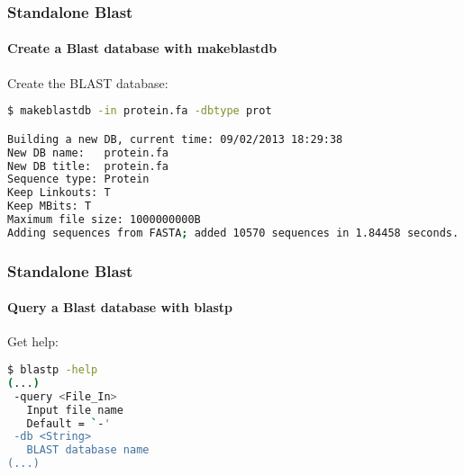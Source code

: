 \documentclass{beamer}
\begin{document}
\begin{frame}[fragile]
\frametitle{Standalone Blast}
\framesubtitle{Create a Blast database with makeblastdb}
Create the BLAST database:
\begin{lstlisting}[language=bash]
$ makeblastdb -in protein.fa -dbtype prot

Building a new DB, current time: 09/02/2013 18:29:38
New DB name:   protein.fa
New DB title:  protein.fa
Sequence type: Protein
Keep Linkouts: T
Keep MBits: T
Maximum file size: 1000000000B
Adding sequences from FASTA; added 10570 sequences in 1.84458 seconds.
\end{lstlisting}
\end{frame}

\begin{frame}[fragile]
\frametitle{Standalone Blast}
\framesubtitle{Query a Blast database with blastp}
Get help:
\begin{lstlisting}[language=bash]
$ blastp -help
(...)
 -query <File_In>
   Input file name
   Default = `-'
 -db <String>
   BLAST database name
(...)
\end{lstlisting}
\end{frame}
\end{document}
